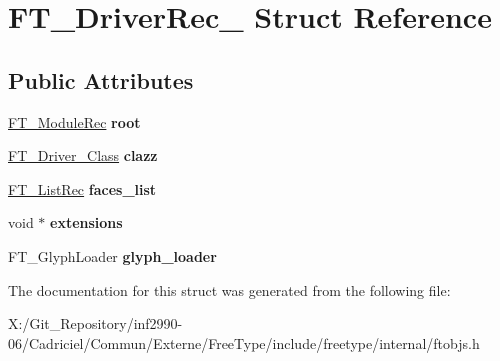 \hypertarget{struct_f_t___driver_rec__}{\section{F\-T\-\_\-\-Driver\-Rec\-\_\- Struct Reference}
\label{struct_f_t___driver_rec__}
}
\subsection*{Public Attributes}
\begin{DoxyCompactItemize}
\item 
\hypertarget{struct_f_t___driver_rec___a8451ceb25c76794fb47e81f477c8222d}{\hyperlink{struct_f_t___module_rec__}{F\-T\-\_\-\-Module\-Rec} {\bfseries root}}\label{struct_f_t___driver_rec___a8451ceb25c76794fb47e81f477c8222d}

\item 
\hypertarget{struct_f_t___driver_rec___a3111153608e5abeb093ed5eb7fef5aec}{\hyperlink{struct_f_t___driver___class_rec__}{F\-T\-\_\-\-Driver\-\_\-\-Class} {\bfseries clazz}}\label{struct_f_t___driver_rec___a3111153608e5abeb093ed5eb7fef5aec}

\item 
\hypertarget{struct_f_t___driver_rec___a2602170e3ecde21a764dc32417aaa002}{\hyperlink{struct_f_t___list_rec__}{F\-T\-\_\-\-List\-Rec} {\bfseries faces\-\_\-list}}\label{struct_f_t___driver_rec___a2602170e3ecde21a764dc32417aaa002}

\item 
\hypertarget{struct_f_t___driver_rec___ad2f1c1a800723dc887dcbc7ce78203d8}{void $\ast$ {\bfseries extensions}}\label{struct_f_t___driver_rec___ad2f1c1a800723dc887dcbc7ce78203d8}

\item 
\hypertarget{struct_f_t___driver_rec___ac28e7adbc14ee82c2b7710d0ee5541e2}{F\-T\-\_\-\-Glyph\-Loader {\bfseries glyph\-\_\-loader}}\label{struct_f_t___driver_rec___ac28e7adbc14ee82c2b7710d0ee5541e2}

\end{DoxyCompactItemize}


The documentation for this struct was generated from the following file\-:\begin{DoxyCompactItemize}
\item 
X\-:/\-Git\-\_\-\-Repository/inf2990-\/06/\-Cadriciel/\-Commun/\-Externe/\-Free\-Type/include/freetype/internal/ftobjs.\-h\end{DoxyCompactItemize}

